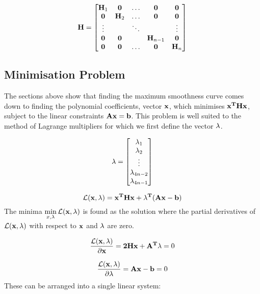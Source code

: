 \documentclass{article}
\begin{document}
\begin{equation*}
    \mathbf{H} = \begin{bmatrix}
        \mathbf{H}_1 & \mathbf{0} & \hdots & \mathbf{0} & \mathbf{0} \\
        \mathbf{0} & \mathbf{H}_2 & \hdots & \mathbf{0} & \mathbf{0} \\
        \vdots & & \ddots & & \vdots \\
        \mathbf{0} & \mathbf{0} & & \mathbf{H}_{n-1} & \mathbf{0} \\
        \mathbf{0} & \mathbf{0} & \hdots & \mathbf{0} & \mathbf{H}_n
    \end{bmatrix}
\end{equation*}

\subsection{Minimisation Problem}
The sections above show that finding the maximum smoothness curve comes down to finding
the polynomial coefficients, vector $\mathbf{x}$, which minimises $\mathbf{x^THx}$, subject to the linear constraints
$\mathbf{Ax=b}$. This problem is well suited to the method of 
Lagrange multipliers for which we first define the vector $\mathbf{\lambda}$.

\begin{equation}
    \mathbf{\lambda} = \begin{bmatrix}
        \lambda_1 \\
        \lambda_2 \\
        \vdots \\
        \lambda_{4n-2} \\
        \lambda_{4n-1} \\
    \end{bmatrix}
\end{equation}

\newcommand{\Lagr}{\mathcal{L}}

\begin{equation}
    \Lagr(\+{x, \lambda}) = \+{x^THx + \lambda^T(Ax - b)}
\end{equation}
The minima $\displaystyle\min_{x, \lambda}\Lagr(\+{x, \lambda})$ is found as the solution
where the partial derivatives of $\Lagr(\+{x, \lambda})$ with respect to $\mathbf{x}$ and $\mathbf{\lambda}$
are zero.

\begin{equation}
    \frac{\Lagr(\+{x, \lambda})}{\partial{\+x}} = \+{2Hx + A^T\lambda} = 0
\end{equation}

\begin{equation}
    \frac{\Lagr(\+{x, \lambda})}{\partial{\+\lambda}} = \+{Ax - b} = 0
\end{equation}
These can be arranged into a single linear system:
\end{document}
